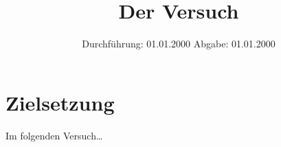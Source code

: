 
\makeatletter\let\expandableinput\@@input\makeatother

\subject{V123}
\title{Der Versuch}
\date{
    Durchführung: 01.01.2000
     \hspace{3em}
    Abgabe: 01.01.2000
}


\maketitle
\thispagestyle{empty}
\tableofcontents
\newpage

\section{Zielsetzung}

    Im folgenden Versuch…


\clearpage


\clearpage


\clearpage


\clearpage

\printbibliography


